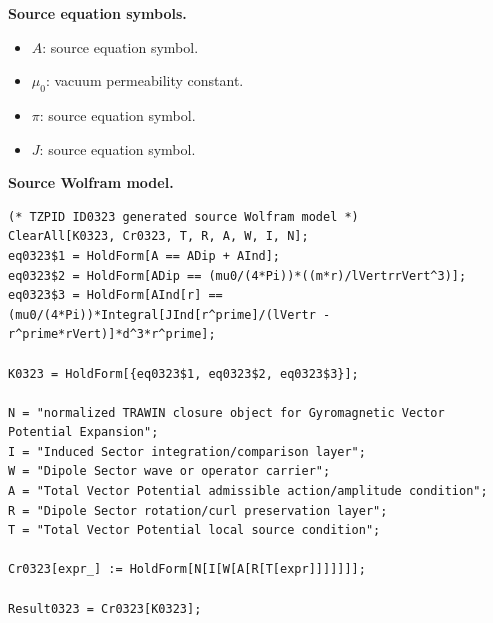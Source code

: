 \begin{minipage}[t]{0.49\linewidth}
\begingroup
\small
\raggedright
\textbf{Source equation symbols.}\par
\begin{itemize}[leftmargin=1.35em,itemsep=1pt,topsep=1pt,parsep=0pt]
    \item $A$: source equation symbol.
    \item $\mu_{0}$: vacuum permeability constant.
    \item $\pi$: source equation symbol.
    \item $J$: source equation symbol.
\end{itemize}
\endgroup
\end{minipage}\hfill
\begin{minipage}[t]{0.47\linewidth}
\begingroup
\scriptsize
\raggedright
\textbf{Source Wolfram model.}\par
\begin{Verbatim}[fontsize=\tiny,breaklines=true,breakanywhere=true]
(* TZPID ID0323 generated source Wolfram model *)
ClearAll[K0323, Cr0323, T, R, A, W, I, N];
eq0323$1 = HoldForm[A == ADip + AInd];
eq0323$2 = HoldForm[ADip == (mu0/(4*Pi))*((m*r)/lVertrrVert^3)];
eq0323$3 = HoldForm[AInd[r] == (mu0/(4*Pi))*Integral[JInd[r^prime]/(lVertr - r^prime*rVert)]*d^3*r^prime];

K0323 = HoldForm[{eq0323$1, eq0323$2, eq0323$3}];

N = "normalized TRAWIN closure object for Gyromagnetic Vector Potential Expansion";
I = "Induced Sector integration/comparison layer";
W = "Dipole Sector wave or operator carrier";
A = "Total Vector Potential admissible action/amplitude condition";
R = "Dipole Sector rotation/curl preservation layer";
T = "Total Vector Potential local source condition";

Cr0323[expr_] := HoldForm[N[I[W[A[R[T[expr]]]]]]];

Result0323 = Cr0323[K0323];
\end{Verbatim}
\endgroup
\end{minipage}

